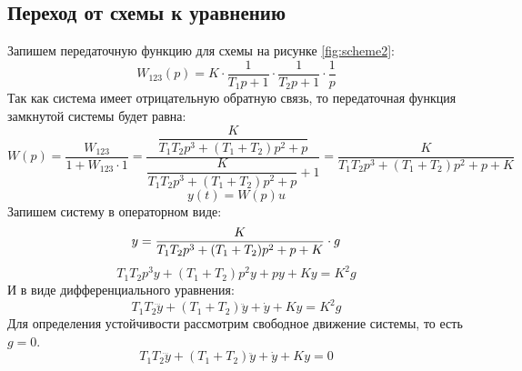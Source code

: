 \subsection{Переход от схемы к уравнению} 
Запишем передаточную функцию для схемы на рисунке \ref{fig:scheme2}:
\begin{equation}
    W_{123}(p) = K \cdot \frac{1}{T_1p + 1} \cdot \frac{1}{T_2p + 1} \cdot \frac{1}{p}
\end{equation}
Так как система имеет отрицательную обратную связь, то передаточная функция замкнутой системы 
будет равна:
\begin{equation}
    W(p) = \frac{W_{123}}{1 + W_{123}\cdot 1} = \frac{\dfrac{K}{T_1T_2p^3 + (T_1 + T_2)p^2 + p}}{\dfrac{K}{T_1T_2p^3 + (T_1 + T_2)p^2 + p} + 1} = \frac{K}{T_1T_2p^3 + (T_1 + T_2)p^2 + p + K}
\end{equation}
\begin{equation}
    y(t) = W(p)u
\end{equation}
Запишем систему в операторном виде:
\begin{equation}
    y = \frac{K}{T_1T_2p^3 + (T_1 + T_2)p^2 + p + K} \cdot g
    \notag
\end{equation}
\begin{equation}
    T_1T_2p^3 y + (T_1 + T_2)p^2 y + p y + Ky = K^2 g
\end{equation}
И в виде дифференциального уравнения:
\begin{equation}
    T_1T_2 \dddot{y} + (T_1 + T_2) \ddot{y} + \dot{y} + Ky = K^2 g
\end{equation}
Для определения устойчивости рассмотрим свободное движение системы, то есть $g = 0$.
\begin{equation}
    T_1T_2 \dddot{y} + (T_1 + T_2) \ddot{y} + \dot{y} + Ky = 0
    \label{eq:system2}
\end{equation}
